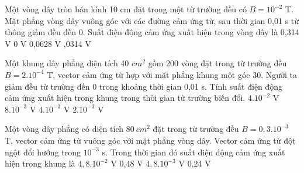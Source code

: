 \begin{vidu}%
Một vòng dây tròn bán kính 10 cm đặt trong một từ trường đều có $B = 10^{-2}$ T. Mặt phẳng vòng dây vuông góc với các đường cảm ứng từ, sau thời gian 0,01 s từ thông giảm đều đến 0. Suất điện động cảm ứng xuất hiện trong vòng dây là
\choice
{0,314 V}
{0 V}
{0,0628 V}
{,0314 V}
\end{vidu}
\begin{vidu}%
Một khung dây phẳng diện tích 40 $cm^2$ gồm 200 vòng đặt trong từ trường đều $B = 2.10^{-4}$   T, vector cảm ứng từ hợp với mặt phẳng khung một góc 30\degree. Người ta giảm đều từ trường đến 0 trong khoảng thời gian 0,01 s. Tính suất điện động cảm ứng xuất hiện trong khung trong thời gian từ trường biến đổi.
\choice
{$4.10^{-2}$ V}
{\True $8.10^{-3}$ V}
{$4.10^{-3}$ V}
{$2.10^{-3}$ V}
\end{vidu}
\begin{vidu}%
Một vòng dây phẳng có diện tích $80\ cm^2$ đặt trong từ trường đều $B = 0,3.10^{-3}$ T, vector cảm ứng từ vuông góc với mặt phẳng vòng dây. Vector cảm ứng từ đột ngột đổi hướng trong $10^{-3}$ s. Trong thời gian đó suất điện động cảm ứng xuất hiện trong khung là
\choice
{$4,8.10^{-2}$ V}
{0,48 V}
{\True $4,8.10^{-3}$ V}
{0,24 V}
\end{vidu}
